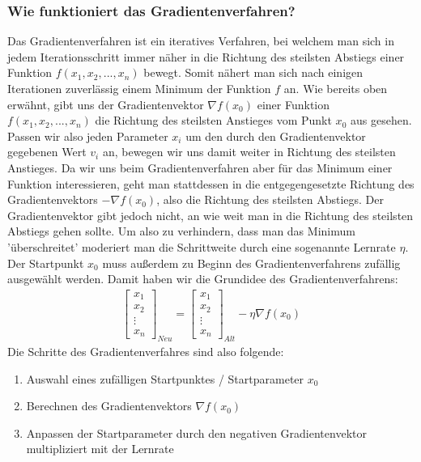 \subsubsection{Wie funktioniert das Gradientenverfahren?}\label{subsec:gradientenverfahren:wie_funktioniert}
  Das Gradientenverfahren ist ein iteratives Verfahren, bei welchem man sich in jedem Iterationsschritt immer näher in die Richtung des
  steilsten Abstiegs einer Funktion $f(x_{1}, x_{2}, ... , x_{n})$ bewegt. Somit nähert man sich nach einigen Iterationen zuverlässig einem Minimum der Funktion $f$ an.
  \bigbreak\noindent
  Wie bereits oben erwähnt, gibt uns der Gradientenvektor $\nabla f(x_{0})$ einer Funktion $f(x_{1}, x_{2}, ... , x_{n})$ die Richtung des steilsten Anstieges vom Punkt $x_0$ aus gesehen.
  Passen wir also jeden Parameter $x_{i}$ um den durch den Gradientenvektor gegebenen Wert $v_{i}$ an, bewegen wir uns damit weiter in Richtung des steilsten Anstieges. 
  Da wir uns beim Gradientenverfahren aber für das Minimum einer Funktion interessieren, geht man stattdessen in die entgegengesetzte Richtung
  des Gradientenvektors $-\nabla f(x_{0})$, also die Richtung des steilsten Abstiegs. Der Gradientenvektor gibt jedoch nicht, an wie weit man in die Richtung des steilsten 
  Abstiegs gehen sollte. Um also zu verhindern, dass man das Minimum 'überschreitet' moderiert man die Schrittweite durch eine sogenannte Lernrate $\eta$.
  Der Startpunkt $x_{0}$ muss außerdem zu Beginn des Gradientenverfahrens zufällig ausgewählt werden.
  Damit haben wir die Grundidee des Gradientenverfahrens: 
  \begin{align*}
    \begin{bmatrix}
          x_{1}\\
          x_{2}\\
          \vdots \\
          x_{n}
         \end{bmatrix}_{Neu} = \begin{bmatrix}
          x_{1}\\
          x_{2}\\
          \vdots \\
          x_{n}
         \end{bmatrix}_{Alt} - \eta \nabla f(x_{0})
  \end{align*}
  \noindent
  Die Schritte des Gradientenverfahres sind also folgende: 
  \begin{enumerate}
    \item Auswahl eines zufälligen Startpunktes / Startparameter $x_{0}$
    \item Berechnen des Gradientenvektors $\nabla f(x_{0})$
    \item Anpassen der Startparameter durch den negativen Gradientenvektor multipliziert mit der Lernrate
  \end{enumerate}
